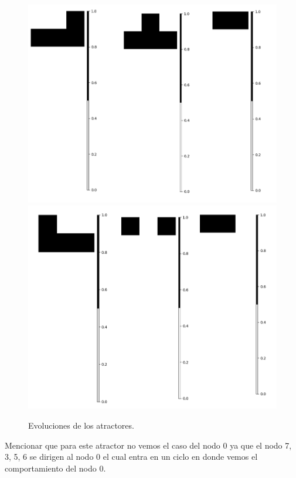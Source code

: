\documentclass[11pt]{article}
\begin{document}
			\begin{figure}[H]
			\centering
			\includegraphics[scale=0.3]{resources/Atractores22/atractor_22_size_3_res.png}
			\includegraphics[scale=0.3]{resources/Atractores22/atractor_22_size_3_res1.png}
			\caption{Evoluciones de los atractores.}\label{fig:picture}
			\end{figure}
			Mencionar que para este atractor no vemos el caso del nodo 0 ya que el nodo 7, 3, 5, 6 se dirigen al nodo 0 el cual entra en un ciclo en donde vemos el comportamiento del nodo 0.
\end{document}
